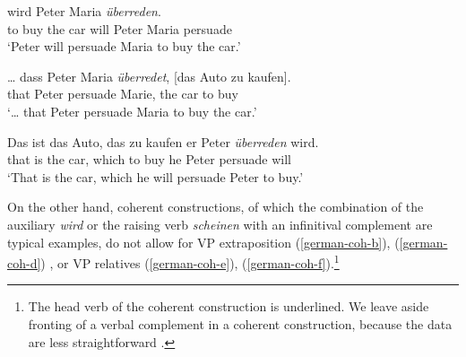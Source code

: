 \documentclass[output=paper]{langsci/langscibook}
\begin{document}
	
	\begin{exe}
		\ex \label{german}
		\begin{xlist}
			
			\ex \label{german1}
			 wird Peter Maria \textit{\"uberreden}. \\
			to buy the car will Peter Maria persuade\\
			\glt `Peter will persuade Maria to buy the car.'
			
			\ex  \label{german2}
			\gll  \ldots{} dass Peter Maria \textit{\"uberredet}, [das Auto zu kaufen]. \\
			      {}       that Peter persuade Marie, the car to buy\\
			\glt `\ldots{} that Peter persuade Maria to buy the car.'
			
			\ex  \label{german3}
			\gll Das ist das Auto, das zu kaufen er Peter \textit{\"uberreden} wird.\\
			that is the car, which to buy he Peter persuade will\\
			\glt `That is the car, which he will persuade Peter to buy.'
			
			
		\end{xlist}
	\end{exe}
	
	
	On the other hand, coherent constructions, of which the combination of the auxiliary \textit{wird} or the raising verb \textit{scheinen} with an infinitival complement are typical examples, do not allow for VP extraposition (\ref{german-coh-b}), (\ref{german-coh-d}) \citep[from][]{Mueller2002b}, or VP relatives (\ref{german-coh-e}), (\ref{german-coh-f}).\footnote{The head verb of the coherent construction is underlined. We leave aside fronting of a verbal complement in a coherent construction, because the data are less straightforward \citep{dKM2001a, Mueller2002b}.}
	
\end{document}
